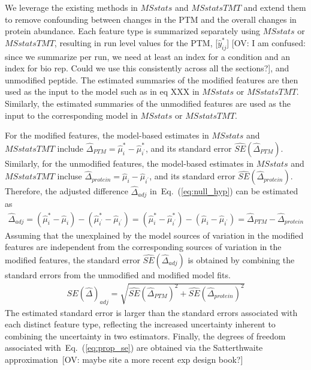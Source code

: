 \documentclass[mcp]{article}
\numberwithin{table}{section}
\def\todo#1{{\color{red}[#1]}}
\def\ov#1{{\color{red}#1}}
\def\eqref#1{Eq.~(\ref{eq:#1})}
\begin{document}
We leverage the existing methods in $MSstats$ and $MSstatsTMT$ and extend them to remove confounding between changes in the PTM and the overall changes in protein abundance.  Each feature type is summarized separately using $MSstats$ or $MSstatsTMT$, resulting in run level values for the PTM, \todo{$\hat{y}_{ij}^{\ast}$} \todo{OV: I am confused: since we summarize per run, we need at least an index for a condition and an index for bio rep. Could we use this consistently across all the sections?}, and unmodified peptide. The estimated summaries of the modified features are then used as the input to the model \ov{such as in eq XXX} in $MSstats$ or $MSstatsTMT$. Similarly, the estimated summaries of the unmodified features are used as the input to the corresponding model in $MSstats$ or $MSstatsTMT$.


For the modified features, the model-based estimates in $MSstats$ and $MSstatsTMT$ include $\hat{\Delta}_{PTM}=\hat{\mu}^{\ast}_{i}-\hat{\mu}_{i^{\prime}}^{\ast}$, and its standard error $\widehat{SE}(\hat{\Delta}_{PTM})$. Similarly, for the unmodified features, the model-based estimates in $MSstats$ and $MSstatsTMT$ incluse $\hat{\Delta}_{protein}=\hat{\mu}_{i}-\hat{\mu}_{i^{\prime}}$, and its standard error $\widehat{SE}(\hat{\Delta}_{protein})$. Therefore, the adjusted difference $\hat{\Delta}_{adj}$ in~\eqref{null_hyp} can be estimated as
\begin{eqnarray}
\hat{\Delta}_{adj} = (\hat{\mu}^{\ast}_{i}-\hat{\mu}_{i}) - (\hat{\mu}_{i^{\prime}}^{\ast}-\hat{\mu}_{i^{\prime}}) = (\hat{\mu}^{\ast}_{i}-\hat{\mu}_{i^{\prime}}^{\ast}) - (\hat{\mu}_{i}-\hat{\mu}_{i^{\prime}}) = \hat{\Delta}_{PTM} - \hat{\Delta}_{protein} 
\label{eq:Delta_hat_adj}
\end{eqnarray}
Assuming that the unexplained by the model  sources of variation in the modified features are independent from the corresponding sources of variation in the modified features, the standard error $\widehat{SE}(\hat{\Delta}_{adj})$ is obtained by combining the standard errors from the unmodified and modified model fits.
\begin{eqnarray}
\widehat{SE}(\hat{\Delta})_{adj} = \sqrt{ \widehat{SE}(\hat{\Delta}_{PTM})^{2} + \widehat{SE}(\hat{\Delta}_{protein})^{2}} 
\label{eq:prop_se}
\end{eqnarray}
The estimated standard error is larger than the standard errors associated with each distinct feature type, reflecting the increased uncertainty inherent to combining the uncertainty in two estimators. Finally, the degrees of freedom associated with~\eqref{prop_se} are obtained via the Satterthwaite approximation~\cite{satterthwaite:1946}\todo{OV: maybe site a more recent exp design book?}
\end{document}
